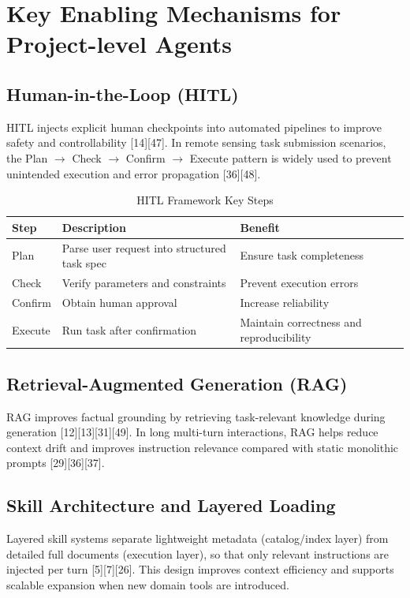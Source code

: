 {	\section{Key Enabling Mechanisms for Project-level Agents}
	
	\subsection{Human-in-the-Loop (HITL)}
	HITL injects explicit human checkpoints into automated pipelines to improve safety and controllability [14][47]. In remote sensing task submission scenarios, the Plan $\rightarrow$ Check $\rightarrow$ Confirm $\rightarrow$ Execute pattern is widely used to prevent unintended execution and error propagation [36][48].
	
	\begin{table}[h!]
		\centering
		\footnotesize
		\caption{HITL Framework Key Steps}
		\label{tab:hitl-steps}
		\begin{tabular}{l p{8cm} p{4cm}}
			\hline
			Step & Description & Benefit \\
			\hline
			Plan & Parse user request into structured task spec & Ensure task completeness \\
			Check & Verify parameters and constraints & Prevent execution errors \\
			Confirm & Obtain human approval & Increase reliability \\
			Execute & Run task after confirmation & Maintain correctness and reproducibility \\
			\hline
		\end{tabular}
	\end{table}
	
	\subsection{Retrieval-Augmented Generation (RAG)}
	RAG improves factual grounding by retrieving task-relevant knowledge during generation [12][13][31][49]. In long multi-turn interactions, RAG helps reduce context drift and improves instruction relevance compared with static monolithic prompts [29][36][37].
	
	\subsection{Skill Architecture and Layered Loading}
	Layered skill systems separate lightweight metadata (catalog/index layer) from detailed full documents (execution layer), so that only relevant instructions are injected per turn [5][7][26]. This design improves context efficiency and supports scalable expansion when new domain tools are introduced.
	
}
